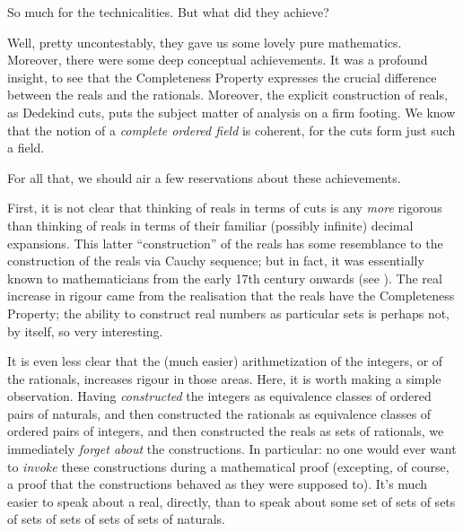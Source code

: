 \documentclass[../../../include/open-logic-section]{subfiles}
\begin{document}

So much for the technicalities. But what did they achieve?

Well, pretty uncontestably, they gave us some {lovely} pure mathematics. Moreover,
there were some deep conceptual achievements. It was a profound
insight, to see that the Completeness Property expresses the crucial
difference between the reals and the rationals. Moreover, the explicit
construction of reals, as Dedekind cuts, puts the subject matter of
analysis on a firm footing. We know that the notion of a
\emph{complete ordered field} is coherent, for the cuts form just such
a field. 

For all that, we should air a few reservations about these achievements. 

First, it is not clear that thinking of reals in terms of cuts is any
\emph{more} rigorous than thinking of reals in terms of their familiar
(possibly infinite) decimal expansions. This latter ``construction''
of the reals has some resemblance to the construction of the reals via
Cauchy sequence; but in fact, it was essentially known to
mathematicians from the early 17th century onwards (see
). The real increase in rigour came from the
realisation that the reals have the Completeness Property; the ability
to construct real numbers as particular sets is perhaps not, by
itself, so very interesting.

It is even less clear that the (much easier) arithmetization of the
integers, or of the rationals, increases rigour in those areas. Here,
it is worth making a simple observation. Having \emph{constructed} the
integers as equivalence classes of ordered pairs of naturals, and then
constructed the rationals as equivalence classes of ordered pairs of
integers, and then constructed the reals as sets of rationals, we
immediately \emph{forget about} the constructions. In particular: no
one would ever want to \emph{invoke} these constructions during a
mathematical proof (excepting, of course, a proof that the
constructions behaved as they were supposed to). It's much easier to
speak about a real, directly, than to speak about some set of sets of
sets of sets of sets of sets of sets of naturals. 
%
%
%
	
\end{document}
